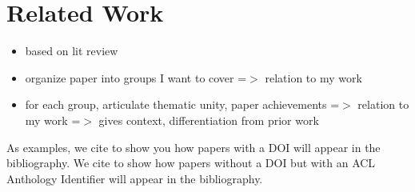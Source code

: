 \section{Related Work}

\begin{itemize}
  \item based on lit review
  \item organize paper into groups I want to cover =$>$ relation to my work
  \item for each group, articulate thematic unity, paper achievements =$>$ relation to my work =$>$ gives context, differentiation from prior work
\end{itemize}

As examples, we cite \citep{vaswani-2017-attention} to show you how papers with a DOI will appear in the bibliography.
We cite \citep{monroe-2017-colors} to show how papers without a DOI but with an ACL Anthology Identifier will appear in the bibliography.